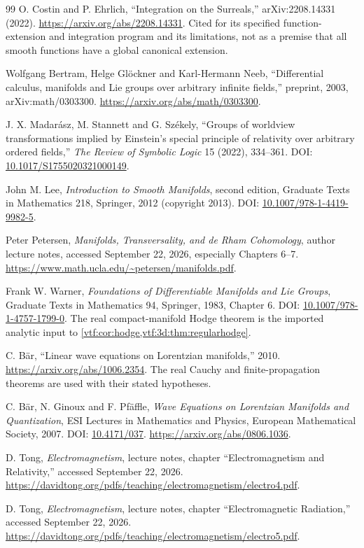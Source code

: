 \documentclass[11pt,letterpaper]{article}
\theoremstyle{definition}
\theoremstyle{remark}
\begin{document}
\begin{thebibliography}{99}
O. Costin and P. Ehrlich, ``Integration on the Surreals,'' arXiv:2208.14331
(2022). \url{https://arxiv.org/abs/2208.14331}.
Cited for its specified function-extension and integration program and its
limitations, not as a premise that all smooth functions have a global canonical
extension.

Wolfgang Bertram, Helge Gl\"ockner and Karl-Hermann Neeb,
``Differential calculus, manifolds and Lie groups over arbitrary infinite
fields,'' preprint, 2003, arXiv:math/0303300.
\url{https://arxiv.org/abs/math/0303300}.

J. X. Madar\'asz, M. Stannett and G. Sz\'ekely, ``Groups of worldview
transformations implied by Einstein's special principle of relativity over
arbitrary ordered fields,'' \emph{The Review of Symbolic Logic} 15 (2022),
334--361. DOI:
\href{https://doi.org/10.1017/S1755020321000149}{10.1017/S1755020321000149}.

John M. Lee, \emph{Introduction to Smooth Manifolds}, second edition,
Graduate Texts in Mathematics 218, Springer, 2012 (copyright 2013).
DOI: \href{https://doi.org/10.1007/978-1-4419-9982-5}{10.1007/978-1-4419-9982-5}.

Peter Petersen, \emph{Manifolds, Transversality, and de Rham Cohomology},
author lecture notes, accessed September 22, 2026, especially Chapters 6--7.
\url{https://www.math.ucla.edu/~petersen/manifolds.pdf}.

Frank W. Warner, \emph{Foundations of Differentiable Manifolds and Lie
Groups}, Graduate Texts in Mathematics 94, Springer, 1983, Chapter 6.
DOI: \href{https://doi.org/10.1007/978-1-4757-1799-0}{10.1007/978-1-4757-1799-0}.
The real compact-manifold Hodge theorem is the imported analytic input to
\cref{vtf:cor:hodge,vtf:3d:thm:regularhodge}.

C. B\"ar, ``Linear wave equations on Lorentzian manifolds,'' 2010.
\url{https://arxiv.org/abs/1006.2354}.
The real Cauchy and finite-propagation theorems are used with their stated
hypotheses.

C. B\"ar, N. Ginoux and F. Pf\"affle, \emph{Wave Equations on Lorentzian
Manifolds and Quantization}, ESI Lectures in Mathematics and Physics, European
Mathematical Society, 2007. DOI: \href{https://doi.org/10.4171/037}{10.4171/037}.
\url{https://arxiv.org/abs/0806.1036}.

D. Tong, \emph{Electromagnetism}, lecture notes, chapter ``Electromagnetism and
Relativity,'' accessed September 22, 2026.
\url{https://davidtong.org/pdfs/teaching/electromagnetism/electro4.pdf}.

D. Tong, \emph{Electromagnetism}, lecture notes, chapter ``Electromagnetic
Radiation,'' accessed September 22, 2026.
\url{https://davidtong.org/pdfs/teaching/electromagnetism/electro5.pdf}.
\end{thebibliography}
\end{document}
